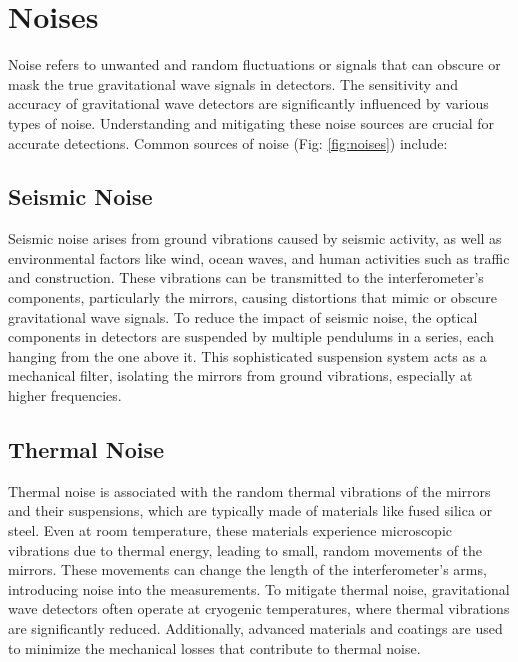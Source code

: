 \section{Noises}

Noise refers to unwanted and random fluctuations or signals that can obscure or mask the true gravitational wave signals in detectors. The sensitivity and accuracy of gravitational wave detectors are significantly influenced by various types of noise. Understanding and mitigating these noise sources are crucial for accurate detections. Common sources of noise (Fig: \ref{fig:noises}) include:

\subsection{Seismic Noise} Seismic noise arises from ground vibrations caused by seismic activity, as well as environmental factors like wind, ocean waves, and human activities such as traffic and construction. These vibrations can be transmitted to the interferometer's components, particularly the mirrors, causing distortions that mimic or obscure gravitational wave signals. To reduce the impact of seismic noise, the optical components in detectors are suspended by multiple pendulums in a series, each hanging from the one above it. This sophisticated suspension system acts as a mechanical filter, isolating the mirrors from ground vibrations, especially at higher frequencies.

\subsection{Thermal Noise} Thermal noise is associated with the random thermal vibrations of the mirrors and their suspensions, which are typically made of materials like fused silica or steel. Even at room temperature, these materials experience microscopic vibrations due to thermal energy, leading to small, random movements of the mirrors. These movements can change the length of the interferometer's arms, introducing noise into the measurements. To mitigate thermal noise, gravitational wave detectors often operate at cryogenic temperatures, where thermal vibrations are significantly reduced. Additionally, advanced materials and coatings are used to minimize the mechanical losses that contribute to thermal noise.

